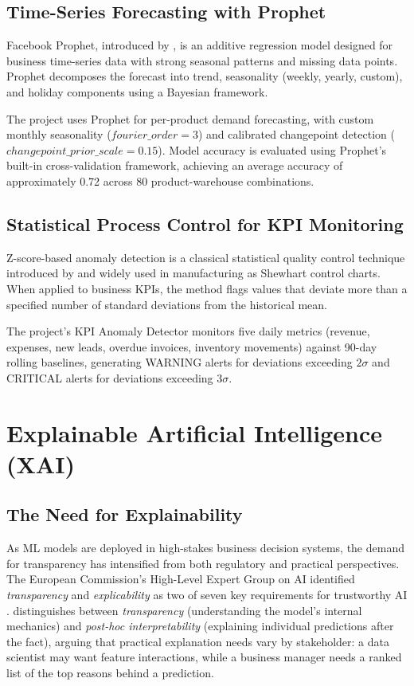 \documentclass[12pt,a4paper]{report}
\begin{document}
\subsection{Time-Series Forecasting with Prophet}

Facebook Prophet, introduced by \citet{taylor2018forecasting}, is an additive regression model designed for business time-series data with strong seasonal patterns and missing data points. Prophet decomposes the forecast into trend, seasonality (weekly, yearly, custom), and holiday components using a Bayesian framework.

The project uses Prophet for per-product demand forecasting, with custom monthly seasonality ($fourier\_order = 3$) and calibrated changepoint detection ($changepoint\_prior\_scale = 0.15$). Model accuracy is evaluated using Prophet's built-in cross-validation framework, achieving an average accuracy of approximately 0.72 across 80 product-warehouse combinations.

\subsection{Statistical Process Control for KPI Monitoring}

Z-score-based anomaly detection is a classical statistical quality control technique introduced by \citet{shewhart1931economic} and widely used in manufacturing as Shewhart control charts. When applied to business KPIs, the method flags values that deviate more than a specified number of standard deviations from the historical mean.

The project's KPI Anomaly Detector monitors five daily metrics (revenue, expenses, new leads, overdue invoices, inventory movements) against 90-day rolling baselines, generating WARNING alerts for deviations exceeding $2\sigma$ and CRITICAL alerts for deviations exceeding $3\sigma$.


\section{Explainable Artificial Intelligence (XAI)}
\label{sec:xai_literature}

\subsection{The Need for Explainability}

As ML models are deployed in high-stakes business decision systems, the demand for transparency has intensified from both regulatory and practical perspectives. The European Commission's High-Level Expert Group on AI identified \textit{transparency} and \textit{explicability} as two of seven key requirements for trustworthy AI \citep{eu2019ethics}. \citet{lipton2018mythos} distinguishes between \textit{transparency} (understanding the model's internal mechanics) and \textit{post-hoc interpretability} (explaining individual predictions after the fact), arguing that practical explanation needs vary by stakeholder: a data scientist may want feature interactions, while a business manager needs a ranked list of the top reasons behind a prediction.
\end{document}
